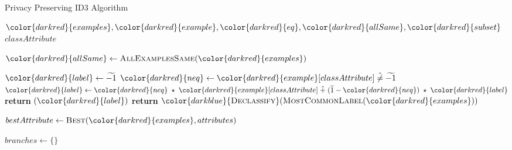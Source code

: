 \begin{algorithm}[H]
\caption{Privacy Preserving ID3 Algorithm}\label{a:id3-pp}
\begin{algorithmic}[1]
\renewcommand{\algorithmicrequire}{\textbf{Private Vars:}}
\Require ${\color{darkred}{examples}}, {\color{darkred}{example}}, {\color{darkred}{eq}}, {\color{darkred}{allSame}}, {\color{darkred}{subset}}$
\renewcommand{\algorithmicrequire}{\textbf{Global Vars:}}
\Require $classAttribute$

    \State ${\color{darkred}{allSame}} \gets \textsc{AllExamplesSame}({\color{darkred}{examples}})$

        \State ${\color{darkred}{label}} \gets \enc{-1}$
        \For{${\color{darkred}{example}} \in {\color{darkred}{examples}}$}
            \State ${\color{darkred}{neq}} \gets {\color{darkred}{example}}[classAttribute] \hneq \enc{-1}$
            \State ${\color{darkred}{label}} \gets {\color{darkred}{neq}} \hmul {\color{darkred}{example}}[classAttribute] \hplus (\enc{1} - {\color{darkred}{neq}}) \hmul {\color{darkred}{label}} $
        \EndFor
        \State \textbf{return} {{}}$({\color{darkred}{label}})$
        \State \textbf{return} ${\color{darkblue}{\textsc{Declassify}}}(\textsc{MostCommonLabel}({\color{darkred}{examples}}))$
    \EndIf

    \State $bestAttribute \gets \textsc{Best}({\color{darkred}{examples}}, attributes)$


    \State $branches \gets \{\}$


\end{algorithmic}
\end{algorithm}
